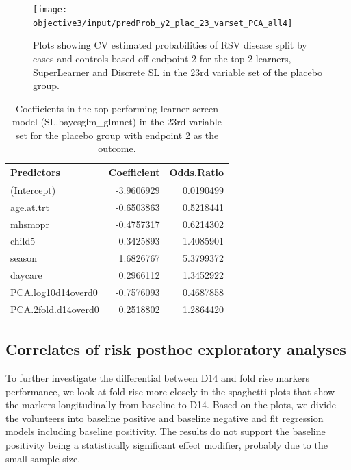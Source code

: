 \documentclass[11pt]{article}
\begin{document}
\begin{figure}[H]
    \centering
    \texttt{[image: objective3/input/predProb\_y2\_plac\_23\_varset\_PCA\_all4]}
    \caption{Plots showing CV estimated probabilities of RSV disease split by cases and controls based off endpoint 2 for the top 2 learners, SuperLearner and Discrete SL in the 23rd variable set of the placebo group.}
    \label{fig:predProb_y2_plac_chosenvarset}
    \end{figure}

\begin{table}[!h]

\caption{\label{tab:coefy2plac23varsetPCAall4}Coefficients in the top-performing learner-screen model (SL.bayesglm\_glmnet) in the 23rd variable set for the placebo group with endpoint 2 as the outcome.}
\centering
\fontsize{10}{12}\selectfont
\begin{tabular}[t]{lrr}
\toprule
Predictors & Coefficient & Odds.Ratio\\
\midrule
(Intercept) & -3.9606929 & 0.0190499\\
age.at.trt & -0.6503863 & 0.5218441\\
mhsmopr & -0.4757317 & 0.6214302\\
child5 & 0.3425893 & 1.4085901\\
season & 1.6826767 & 5.3799372\\
daycare & 0.2966112 & 1.3452922\\
PCA.log10d14overd0 & -0.7576093 & 0.4687858\\
PCA.2fold.d14overd0 & 0.2518802 & 1.2864420\\
\bottomrule
\end{tabular}
\end{table}

\hypertarget{correlates-of-risk-posthoc-exploratory-analyses}{%
\subsection{Correlates of risk posthoc exploratory analyses}\label{correlates-of-risk-posthoc-exploratory-analyses}}

To further investigate the differential between D14 and fold rise markers performance, we look at fold rise more closely in the spaghetti plots that show the markers longitudinally from baseline to D14. Based on the plots, we divide the volunteers into baseline positive and baseline negative and fit regression models including baseline positivity. The results do not support the baseline positivity being a statistically significant effect modifier, probably due to the small sample size.
\end{document}
